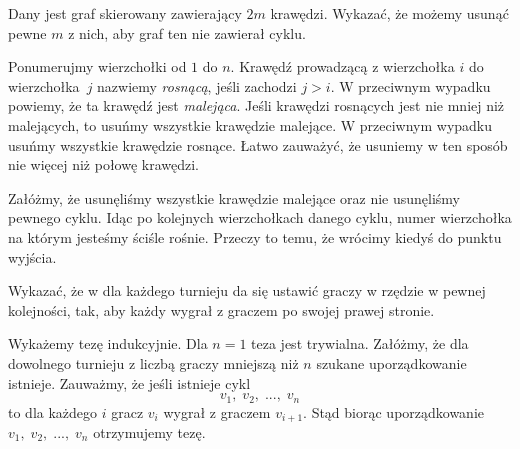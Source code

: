 \newpage
{}

\begin{problem}{1}
	Dany jest graf skierowany zawierający $2m$ krawędzi. Wykazać, że możemy usunąć pewne $m$ z nich, aby graf ten nie zawierał cyklu.
\end{problem}

\noindent
Ponumerujmy wierzchołki od $1$ do $n$. Krawędź prowadzącą z wierzchołka $i$ do wierzchołka~$j$ nazwiemy \textit{rosnącą}, jeśli zachodzi $j > i$. W przeciwnym wypadku powiemy, że ta krawędź jest \textit{malejąca}. Jeśli krawędzi rosnących jest nie mniej niż malejących, to usuńmy wszystkie krawędzie malejące. W przeciwnym wypadku usuńmy wszystkie krawędzie rosnące. Łatwo zauważyć, że usuniemy w ten sposób nie więcej niż połowę krawędzi.

\vspace{10px}
\noindent
Załóżmy, że usunęliśmy wszystkie krawędzie malejące oraz nie usunęliśmy pewnego cyklu. Idąc po kolejnych wierzchołkach danego cyklu, numer wierzchołka na którym jesteśmy ściśle rośnie. Przeczy to temu, że wrócimy kiedyś do punktu wyjścia.

\begin{problem}{2}
	Wykazać, że w dla każdego turnieju da się ustawić graczy w rzędzie w pewnej kolejności, tak, aby każdy wygrał z graczem po swojej prawej stronie.
\end{problem}

\noindent
Wykażemy tezę indukcyjnie. Dla $n = 1$ teza jest trywialna. Załóżmy, że dla dowolnego turnieju z liczbą graczy mniejszą niż $n$ szukane uporządkowanie istnieje. 
Zauważmy, że jeśli istnieje cykl
\[
	v_1, \; v_2, \; ..., \; v_n
\]
to dla każdego $i$ gracz $v_{i}$ wygrał z graczem $v_{i + 1}$. Stąd biorąc uporządkowanie $v_1, \; v_2, \; ..., \; v_n$ otrzymujemy tezę.

\begin{center}
\end{center}

